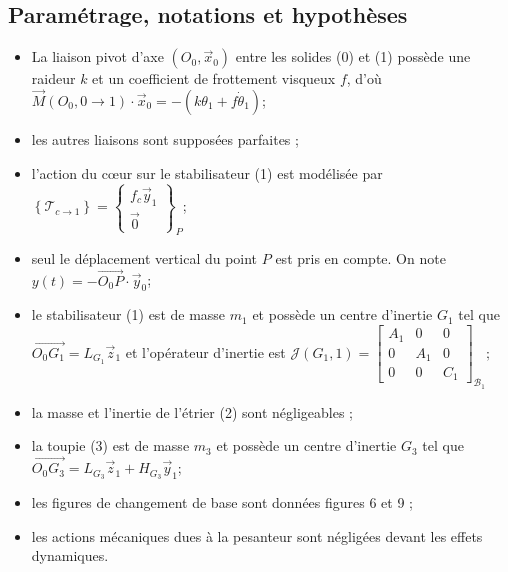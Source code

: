 \subsection*{Paramétrage, notations et hypothèses}
\begin{itemize}
  \item La liaison pivot d'axe $\left(O_{0}, \vec{x}_{0}\right)$ entre les solides (0) et (1) possède une raideur $k$ et un coefficient de frottement visqueux $f$, d'où $\vec{M}\left(O_{0}, 0 \rightarrow 1\right) \cdot \vec{x}_{0}=-\left(k \theta_{1}+f \dot{\theta}_{1}\right)$;

  \item les autres liaisons sont supposées parfaites ;

  \item l'action du cœur sur le stabilisateur (1) est modélisée par $\left\{\mathcal{T}_{c \rightarrow 1}\right\}=\left\{\begin{array}{c}f_{c} \vec{y}_{1} \\ \overrightarrow{0}\end{array}\right\}_{P}$;

\item seul le déplacement vertical du point $P$ est pris en compte. On note $y(t)=-\overrightarrow{O_{0} P} \cdot \vec{y}_{0}$;

\item  le stabilisateur (1) est de masse $m_{1}$ et possède un centre d'inertie $G_{1}$ tel que $\overrightarrow{O_{0} G_{1}}=L_{G_{1}} \vec{z}_{1}$ et l'opérateur d'inertie est $\mathcal{J}\left(G_{1}, 1\right)=\left[\begin{array}{ccc}A_{1} & 0 & 0 \\ 0 & A_{1} & 0 \\ 0 & 0 & C_{1}\end{array}\right]_{\mathcal{B}_{1}} ;$

  \item la masse et l'inertie de l'étrier (2) sont négligeables ;

  \item la toupie (3) est de masse $m_{3}$ et possède un centre d'inertie $G_{3}$ tel que $\overrightarrow{O_{0} G_{3}}=L_{G_{3}} \vec{z}_{1}+H_{G_{3}} \vec{y}_{1}$;

  \item les figures de changement de base sont données figures 6 et 9 ;

  \item les actions mécaniques dues à la pesanteur sont négligées devant les effets dynamiques. 

\end{itemize}
